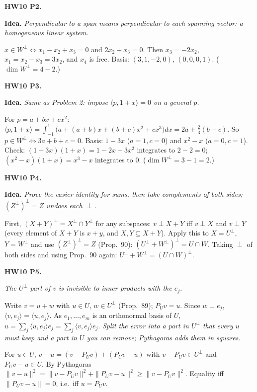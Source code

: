 \documentclass[10pt]{scrartcl}
\newcommand{\ip}[2]{\langle #1,#2\rangle}
\newcommand{\idea}[1]{{\color{OliveGreen!75!black}\textbf{Idea.}} \textit{#1}\par}
\newenvironment{prob}{\par\medskip\noindent\begin{minipage}{\linewidth}\setlength{\parskip}{3pt}}{\end{minipage}\par}
\begin{document}
\begin{prob}
\textbf{HW10 P2. }\par 
\idea{Perpendicular to a span means perpendicular to each spanning vector: a homogeneous linear system.}$x\in W^\perp\iff x_1-x_2+x_3=0$ and $2x_2+x_3=0$. Then $x_3=-2x_2$, $x_1=x_2-x_3=3x_2$, and $x_4$ is free. Basis: $(3,1,-2,0)$, $(0,0,0,1)$. ($\dim W^\perp=4-2$.)
\end{prob}

\begin{prob}
\textbf{HW10 P3. }\par 
\idea{Same as Problem 2: impose $\ip p{1+x}=0$ on a general $p$.}For $p=a+bx+cx^2$: $\ip p{1+x}=\int_{-1}^1\big(a+(a+b)x+(b+c)x^2+cx^3\big)dx=2a+\frac23(b+c)$. So $p\in W^\perp\iff3a+b+c=0$. Basis: $1-3x$ ($a=1,c=0$) and $x^2-x$ ($a=0,c=1$). Check: $(1-3x)(1+x)=1-2x-3x^2$ integrates to $2-2=0$; $(x^2-x)(1+x)=x^3-x$ integrates to $0$. ($\dim W^\perp=3-1=2$.)
\end{prob}

\begin{prob}
\textbf{HW10 P4. }\par 
\idea{Prove the easier identity for sums, then take complements of both sides; $(Z^\perp)^\perp=Z$ undoes each $\perp$.}First, $(X+Y)^\perp=X^\perp\cap Y^\perp$ for any subspaces: $v\perp X+Y$ iff $v\perp X$ and $v\perp Y$ (every element of $X+Y$ is $x+y$, and $X,Y\subseteq X+Y$). Apply this to $X=U^\perp$, $Y=W^\perp$ and use $(Z^\perp)^\perp=Z$ (Prop.~90): $(U^\perp+W^\perp)^\perp=U\cap W$. Taking $\perp$ of both sides and using Prop.~90 again: $U^\perp+W^\perp=(U\cap W)^\perp$.
\end{prob}

\begin{prob}
\textbf{HW10 P5. }\par 
\begin{enumerate}[(a)]
  \ii \idea{The $U^\perp$ part of $v$ is invisible to inner products with the $e_j$.}Write $v=u+w$ with $u\in U$, $w\in U^\perp$ (Prop.~89); $P_Uv=u$. Since $w\perp e_j$, $\ip v{e_j}=\ip u{e_j}$. As $e_1,\dots,e_m$ is an orthonormal basis of $U$, $u=\sum_j\ip u{e_j}e_j=\sum_j\ip v{e_j}e_j$.
  \ii \idea{Split the error into a part in $U^\perp$ that every $u$ must keep and a part in $U$ you can remove; Pythagoras adds them in squares.}For $u\in U$, $v-u=(v-P_Uv)+(P_Uv-u)$ with $v-P_Uv\in U^\perp$ and $P_Uv-u\in U$. By Pythagoras $\|v-u\|^2=\|v-P_Uv\|^2+\|P_Uv-u\|^2\ge\|v-P_Uv\|^2$. Equality iff $\|P_Uv-u\|=0$, i.e.\ iff $u=P_Uv$.
\end{enumerate}
\end{prob}
\end{document}
